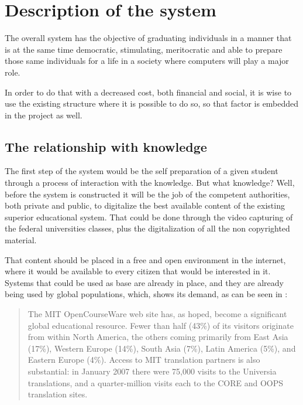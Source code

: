 \section{Description of the system}

The overall system has the objective of graduating individuals in a manner that
is at the same time democratic, stimulating, meritocratic and able to prepare 
those same individuals for a life in a society where computers will
play a major role.

In order to do that with a decreased cost, both financial and social, it is wise
to use the existing structure where it is possible to do so, so that factor is
embedded in the project as well.

\subsection{The relationship with knowledge}

The first step of the system would be the self preparation of a given student
through a process of interaction with the knowledge. But what knowledge? Well,
before the system is constructed it will be the job of the competent
authorities, both private and public, to digitalize the best available content
of the existing superior educational system. That could be done through the
video capturing of the federal universities classes, plus the digitalization of
all the non copyrighted material. 

That content should be placed in a free and open environment in the internet,
where it would be available to every citizen that would be interested in it.
Systems that could be used as base are already in place, and they are already
being used by global populations, which, shows its demand, as can be seen in
\cite{albeson2007__ocw}:

\begin{quote}
    The MIT OpenCourseWare web site has, as hoped, become a significant
    global educational resource. Fewer than half (43\%) of its visitors
    originate from within North America, the others coming primarily from
    East Asia (17\%), Western Europe (14\%), South Asia (7\%), Latin America
    (5\%), and Eastern Europe (4\%). Access to MIT translation partners is
    also substantial: in January 2007 there were 75,000 visits to the
    Universia translations, and a quarter-million visits each to the CORE
    and OOPS translation sites.
\end{quote}

